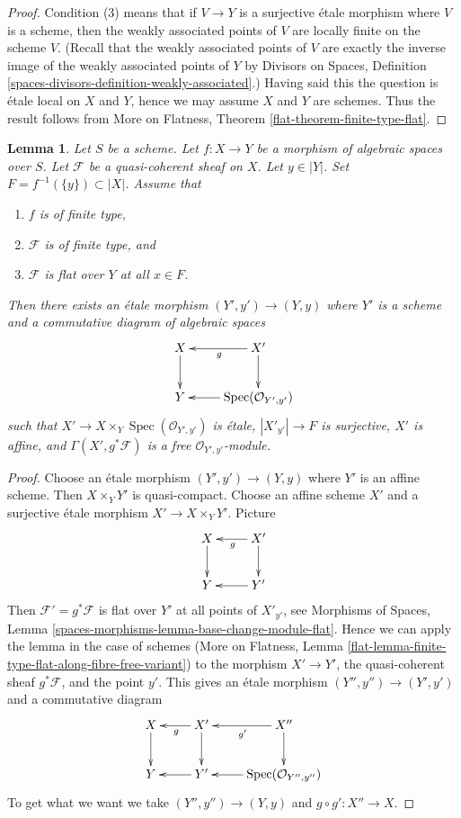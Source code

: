 \documentclass{stacks-project}
\theoremstyle{plain}
\newtheorem{lemma}[subsection]{Lemma}
\theoremstyle{definition}
\theoremstyle{remark}
\numberwithin{equation}{subsection}
\def\Spec{\mathop{\mathrm{Spec}}}
\begin{document}
\begin{proof}
Condition (3) means that if $V \to Y$ is a surjective \'etale morphism
where $V$ is a scheme, then the weakly associated points of $V$
are locally finite on the scheme $V$. (Recall that the weakly associated
points of $V$ are exactly the inverse image of the weakly associated
points of $Y$ by Divisors on Spaces, Definition
\ref{spaces-divisors-definition-weakly-associated}.)
Having said this the question
is \'etale local on $X$ and $Y$, hence we may assume $X$ and $Y$
are schemes. Thus the result follows from
More on Flatness, Theorem \ref{flat-theorem-finite-type-flat}.
\end{proof}

\begin{lemma}
\label{lemma-finite-type-flat-along-fibre-free-variant}
Let $S$ be a scheme. Let $f : X \to Y$ be a morphism of algebraic spaces
over $S$. Let $\mathcal{F}$ be a quasi-coherent sheaf on $X$.
Let $y \in |Y|$. Set $F = f^{-1}(\{y\}) \subset |X|$. Assume that
\begin{enumerate}
\item $f$ is of finite type,
\item $\mathcal{F}$ is of finite type, and
\item $\mathcal{F}$ is flat over $Y$ at all $x \in F$.
\end{enumerate}
Then there exists an \'etale morphism $(Y', y') \to (Y, y)$
where $Y'$ is a scheme and a commutative diagram of algebraic spaces
$$
\xymatrix{
X \ar[d] & X' \ar[l]^g \ar[d] \\
Y & \Spec(\mathcal{O}_{Y', y'}) \ar[l]
}
$$
such that $X' \to X \times_Y \Spec(\mathcal{O}_{Y', y'})$
is \'etale, $|X'_{y'}| \to F$ is surjective, $X'$ is affine,
and $\Gamma(X', g^*\mathcal{F})$ is a free $\mathcal{O}_{Y', y'}$-module.
\end{lemma}

\begin{proof}
Choose an \'etale morphism $(Y', y') \to (Y, y)$ where $Y'$ is an
affine scheme. Then $X \times_Y Y'$ is quasi-compact.
Choose an affine scheme $X'$ and a surjective \'etale morphism
$X' \to X \times_Y Y'$. Picture
$$
\xymatrix{
X \ar[d] & X' \ar[l]^g \ar[d] \\
Y & Y' \ar[l]
}
$$
Then $\mathcal{F}' = g^*\mathcal{F}$ is flat over $Y'$ at all
points of $X'_{y'}$, see Morphisms of Spaces, Lemma
\ref{spaces-morphisms-lemma-base-change-module-flat}.
Hence we can apply the lemma in the case of schemes
(More on Flatness, Lemma
\ref{flat-lemma-finite-type-flat-along-fibre-free-variant})
to the morphism
$X' \to Y'$, the quasi-coherent sheaf $g^*\mathcal{F}$, and the point $y'$.
This gives an \'etale morphism $(Y'', y'') \to (Y', y')$ and a commutative
diagram
$$
\xymatrix{
X \ar[d] & X' \ar[l]^g \ar[d] & X'' \ar[l]^{g'} \ar[d] \\
Y & Y' \ar[l] & \Spec(\mathcal{O}_{Y'', y''}) \ar[l]
}
$$
To get what we want we take $(Y'', y'') \to (Y, y)$
and $g \circ g' : X'' \to X$.
\end{proof}
\end{document}
